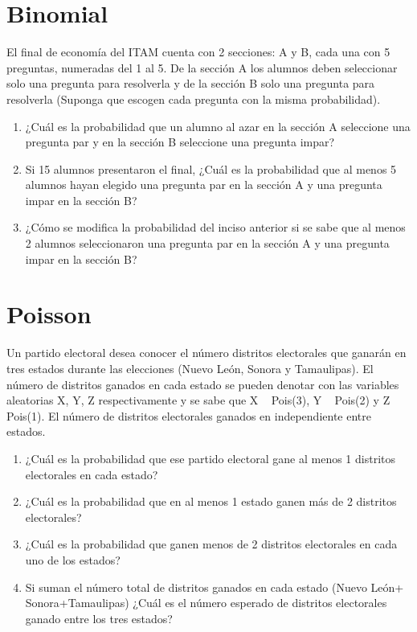 \documentclass[addpoints]{exam}
\theoremstyle{mytheor}
\begin{document}
\begin{questions}
\begin{enumerate}
   \end{enumerate}
  
\section*{Binomial}
\question El final de economía del ITAM cuenta con 2 secciones: A y B, cada una con 5 preguntas, numeradas del 1 al 5. De la sección A los alumnos deben seleccionar solo una pregunta para resolverla y de la sección B solo una pregunta para resolverla (Suponga que escogen cada pregunta con la misma probabilidad).
\begin{enumerate}
   \item ¿Cuál es la probabilidad que un alumno al azar en la sección A seleccione una pregunta par y en la sección B seleccione una pregunta impar?
   \item Si 15 alumnos presentaron el final, ¿Cuál es la probabilidad que al menos 5 alumnos hayan elegido una pregunta par en la sección A y una pregunta impar en la sección B?
   \item ¿Cómo se modifica la probabilidad del inciso anterior si se sabe que al menos 2 alumnos seleccionaron una pregunta par en la sección A y una pregunta impar en la sección B?
\end{enumerate}

\section*{Poisson}
\question Un partido electoral desea conocer el número distritos electorales que ganarán en tres estados durante las elecciones (Nuevo León, Sonora y Tamaulipas). El número de distritos ganados en cada estado se pueden denotar con las variables aleatorias X, Y, Z respectivamente y se sabe que X ~ Pois(3), Y ~ Pois(2) y Z ~ Pois(1). El número de distritos electorales ganados en independiente entre estados. 

\begin{enumerate}
\item ¿Cuál es la probabilidad que ese partido electoral gane al menos 1 distritos electorales en cada estado?
\item ¿Cuál es la probabilidad que en al menos 1 estado ganen más de 2 distritos electorales?
\item ¿Cuál es la probabilidad que ganen menos de 2 distritos electorales en cada uno de los estados?
\item Si suman el número total de distritos ganados en cada estado (Nuevo León+ Sonora+Tamaulipas) ¿Cuál es el número esperado de distritos electorales ganado entre los tres estados?
\end{enumerate}


\end{questions}
\end{document}
